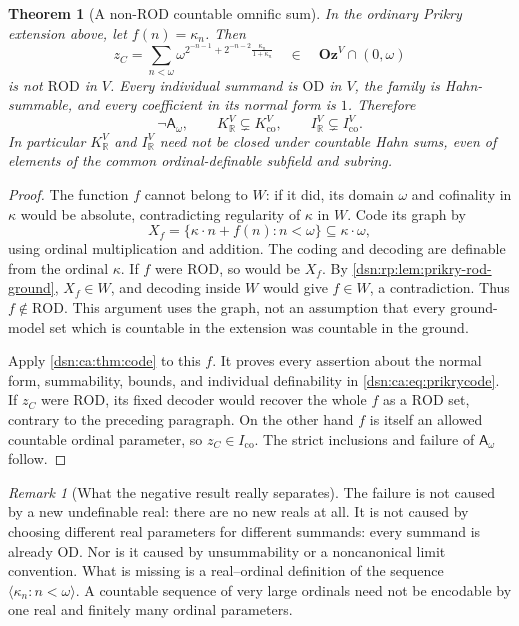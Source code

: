 \documentclass[11pt,a4paper]{article}
\numberwithin{equation}{section}
\newtheorem{theorem}{Theorem}[section]
\theoremstyle{definition}
\theoremstyle{remark}
\newtheorem{remark}[remark]{Remark}
\newcommand{\Oz}{\mathbf{Oz}}
\newcommand{\OD}{\mathrm{OD}}
\newcommand{\R}{\mathbb R}
\newcommand{\ROD}{\mathrm{ROD}}
\newcommand{\KR}{K_{\R}}
\newcommand{\IR}{I_{\R}}
\newcommand{\Kco}{K_{\mathrm{co}}}
\newcommand{\Ico}{I_{\mathrm{co}}}
\newcommand{\Asm}{\mathsf A_{\omega}}
\newcommand{\seq}[1]{\langle #1\rangle}
\begin{document}
\begin{theorem}[A non-$\ROD$ countable omnific sum]\label{dsn:ca:thm:prikry}
In the ordinary Prikry extension above, let $f(n)=\kappa_n$. Then
\begin{equation}\label{dsn:ca:eq:prikrycode}
 z_C=\sum_{n<\omega}
 \omega^{\displaystyle 2^{-n-1}
       +2^{-n-2}\frac{\kappa_n}{1+\kappa_n}}
 \quad\in\quad\Oz^V\cap(0,\omega)
\end{equation}
is not $\ROD$ in $V$. Every individual summand is $\OD$ in $V$,
the family is Hahn-summable, and every coefficient in its normal form
is $1$. Therefore
\[
 \neg\Asm,\qquad \KR^V\subsetneq\Kco^V,
 \qquad \IR^V\subsetneq\Ico^V.
\]
In particular $\KR^V$ and $\IR^V$ need not be closed under countable
Hahn sums, even of elements of the common ordinal-definable subfield
and subring.
\end{theorem}
\begin{proof}
The function $f$ cannot belong to $W$: if it did, its domain $\omega$
and cofinality in $\kappa$ would be absolute, contradicting regularity
of $\kappa$ in $W$. Code its graph by
\[
 X_f=\{\kappa\cdot n+f(n):n<\omega\}
       \subseteq\kappa\cdot\omega,
\]
using ordinal multiplication and addition. The coding and decoding are
definable from the ordinal $\kappa$. If $f$ were $\ROD$, so would be
$X_f$. By \cref{dsn:rp:lem:prikry-rod-ground}, $X_f\in W$, and decoding inside $W$
would give $f\in W$, a contradiction. Thus $f\notin\ROD$. This
argument uses the graph, not an assumption that every ground-model set
which is countable in the extension was countable in the ground.

Apply \cref{dsn:ca:thm:code} to this $f$. It proves every assertion about the
normal form, summability, bounds, and individual definability in
\eqref{dsn:ca:eq:prikrycode}. If $z_C$ were $\ROD$, its fixed decoder would
recover the whole $f$ as a $\ROD$ set, contrary to the preceding
paragraph. On the other hand $f$ is itself an allowed countable ordinal
parameter, so $z_C\in\Ico$. The strict inclusions and failure of
$\Asm$ follow.
\end{proof}

\begin{remark}[What the negative result really separates]
The failure is not caused by a new undefinable real: there are no new
reals at all. It is not caused by choosing different real parameters
for different summands: every summand is already $\OD$. Nor is it
caused by unsummability or a noncanonical limit convention. What is
missing is a real--ordinal definition of the sequence
$\seq{\kappa_n:n<\omega}$. A countable sequence of very large ordinals
need not be encodable by one real and finitely many ordinal parameters.
\end{remark}
\end{document}

